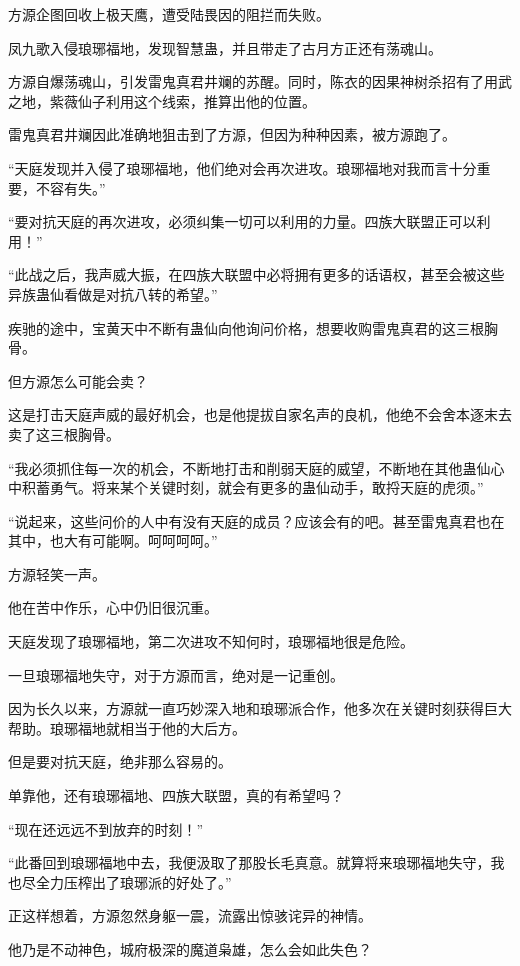 \begin{this_body}
方源企图回收上极天鹰，遭受陆畏因的阻拦而失败。

凤九歌入侵琅琊福地，发现智慧蛊，并且带走了古月方正还有荡魂山。

方源自爆荡魂山，引发雷鬼真君井斓的苏醒。同时，陈衣的因果神树杀招有了用武之地，紫薇仙子利用这个线索，推算出他的位置。

雷鬼真君井斓因此准确地狙击到了方源，但因为种种因素，被方源跑了。

“天庭发现并入侵了琅琊福地，他们绝对会再次进攻。琅琊福地对我而言十分重要，不容有失。”

“要对抗天庭的再次进攻，必须纠集一切可以利用的力量。四族大联盟正可以利用！”

“此战之后，我声威大振，在四族大联盟中必将拥有更多的话语权，甚至会被这些异族蛊仙看做是对抗八转的希望。”

疾驰的途中，宝黄天中不断有蛊仙向他询问价格，想要收购雷鬼真君的这三根胸骨。

但方源怎么可能会卖？

这是打击天庭声威的最好机会，也是他提拔自家名声的良机，他绝不会舍本逐末去卖了这三根胸骨。

“我必须抓住每一次的机会，不断地打击和削弱天庭的威望，不断地在其他蛊仙心中积蓄勇气。将来某个关键时刻，就会有更多的蛊仙动手，敢捋天庭的虎须。”

“说起来，这些问价的人中有没有天庭的成员？应该会有的吧。甚至雷鬼真君也在其中，也大有可能啊。呵呵呵呵。”

方源轻笑一声。

他在苦中作乐，心中仍旧很沉重。

天庭发现了琅琊福地，第二次进攻不知何时，琅琊福地很是危险。

一旦琅琊福地失守，对于方源而言，绝对是一记重创。

因为长久以来，方源就一直巧妙深入地和琅琊派合作，他多次在关键时刻获得巨大帮助。琅琊福地就相当于他的大后方。

但是要对抗天庭，绝非那么容易的。

单靠他，还有琅琊福地、四族大联盟，真的有希望吗？

“现在还远远不到放弃的时刻！”

“此番回到琅琊福地中去，我便汲取了那股长毛真意。就算将来琅琊福地失守，我也尽全力压榨出了琅琊派的好处了。”

正这样想着，方源忽然身躯一震，流露出惊骇诧异的神情。

他乃是不动神色，城府极深的魔道枭雄，怎么会如此失色？


\end{this_body}
